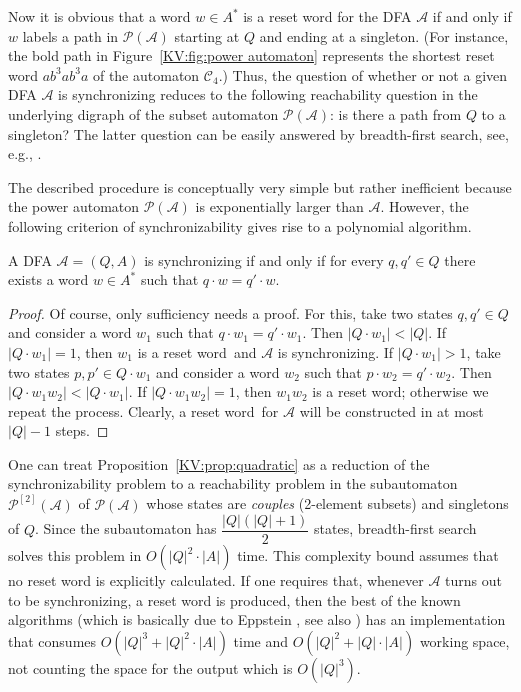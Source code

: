 \documentclass{irmaart}
\newcommand{\sw}{reset word}
\theoremstyle{plain}
\begin{document}
Now it is obvious that a word $w\in A^*$ is a reset word for the
DFA $\mathcal{A}$ if and only if $w$ labels a path in
$\mathcal{P}(\mathcal{A})$ starting at $Q$ and ending at a
singleton. (For instance, the bold path in
Figure~\ref{KV:fig:power automaton} represents the shortest reset
word $ab^3ab^3a$ of the automaton $\mathcal{C}_4$.) Thus, the
question of whether or not a given DFA $\mathcal{A}$ is
synchronizing reduces to the following reachability question in
the underlying digraph of the subset automaton
$\mathcal{P}(\mathcal{A})$: is there a path from $Q$ to a
singleton? The latter question can be easily answered by
breadth-first search,  see, e.g.,
\cite[Section~22.2]{Cormen&Leiserson&Rivest&Stein:2001}.

The described procedure is conceptually very simple but rather inefficient
because the power automaton $\mathcal{P}(\mathcal{A})$ is exponentially larger
than $\mathcal{A}$. However, the following criterion of synchronizability gives
rise to a polynomial algorithm.
\begin{proposition}
\label{KV:prop:quadratic} A DFA $\mathcal{A}=(Q,A)$ is synchronizing if and
only if for every $q,q'\in Q$ there exists a word $w\in A^*$ such that $q\cdot
w=q'\cdot w$.
\end{proposition}

\begin{proof}
Of course, only sufficiency needs a proof. For this, take two states $q,q'\in
Q$ and consider a word $w_1$ such that $q\cdot w_1=q'\cdot w_1$. Then $|Q\cdot
w_1|<|Q|$. If $|Q\cdot w_1|=1$, then $w_1$ is a \sw\ and $\mathcal{A}$ is
synchronizing. If $|Q\cdot w_1|>1$, take two states $p,p'\in Q\cdot w_1$ and
consider a word $w_2$ such that $p\cdot w_2=q'\cdot w_2$. Then $|Q\cdot
w_1w_2|<|Q\cdot w_1|$. If $|Q\cdot w_1w_2|=1$, then $w_1w_2$ is a \sw;
otherwise we repeat the process. Clearly, a \sw\ for $\mathcal{A}$ will be
constructed in at most $|Q|-1$ steps.
\end{proof}

One can treat Proposition~\ref{KV:prop:quadratic} as a reduction of the
synchronizability problem to a reachability problem in the subautomaton
$\mathcal{P}^{[2]}(\mathcal{A})$ of $\mathcal{P}(\mathcal{A})$ whose states are
\emph{couples} (2-element subsets) and singletons of $Q$. Since
the subautomaton has $\dfrac{|Q|(|Q|+1)}2$ states, breadth-first search solves
this problem in $O(|Q|^2\cdot|A|)$ time. This complexity bound assumes that no
reset word is explicitly calculated. If one requires that, whenever
$\mathcal{A}$ turns out to be synchronizing, a reset word is produced, then the
best of the known algorithms (which is basically due to Eppstein
\cite[Theorem~6]{Eppstein:1990}, see also \cite[Theorem~1.15]{Sandberg:2005})
has an implementation that consumes $O(|Q|^3 + |Q|^2\cdot|A|)$ time and
$O(|Q|^2 + |Q|\cdot|A|)$ working space, not counting the space for the output
which is $O(|Q|^3)$.
\end{document}
